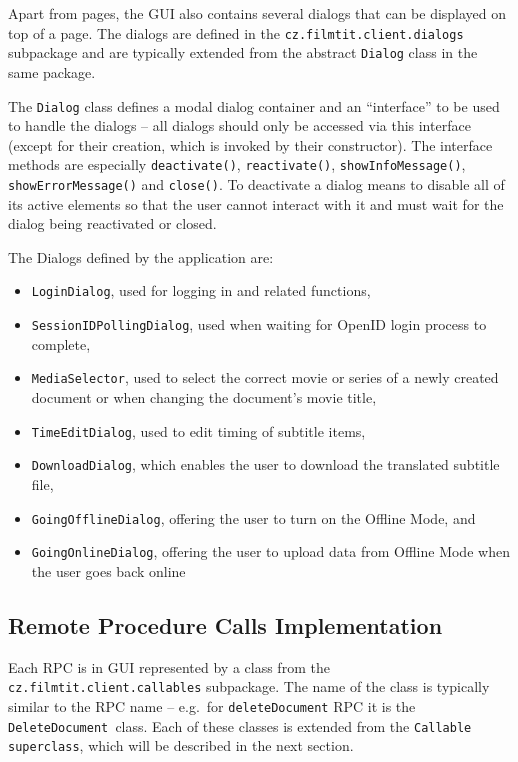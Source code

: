 Apart from pages, the GUI also contains several dialogs that can be displayed on top of a page. The dialogs are defined in the {\tt cz.filmtit.client.dialogs} subpackage and are typically extended from the abstract {\tt Dialog} class in the same package.

The {\tt Dialog} class defines a modal dialog container and an ``interface'' to be used to handle the dialogs -- all dialogs should only be accessed via this interface (except for their creation, which is invoked by their constructor).
The interface methods are especially
{\tt deactivate()}, {\tt reactivate()}, {\tt showInfoMessage()}, {\tt showErrorMessage()} and {\tt close()}. To deactivate a dialog means to disable all of its active elements so that the user cannot interact with it and must wait for the dialog being reactivated or closed.

The Dialogs defined by the application are:
\begin{itemize}
\item {\tt LoginDialog}, used for logging in and related functions,
\item {\tt SessionIDPollingDialog}, used when waiting for OpenID login process to complete,
\item {\tt MediaSelector}, used to select the correct movie or series of a newly created document or when changing the document's movie title,
\item {\tt TimeEditDialog}, used to edit timing of subtitle items,
\item {\tt DownloadDialog}, which enables the user to download the translated subtitle file,
\item {\tt GoingOfflineDialog}, offering the user to turn on the Offline Mode, and
\item {\tt GoingOnlineDialog}, offering the user to upload data from Offline Mode when the user goes back online
\end{itemize}

\subsection{Remote Procedure Calls Implementation}

Each RPC is in GUI represented by a class from the {\tt cz.filmtit.client.callables} subpackage. The name of the class is typically similar to the RPC name -- e.g.\ for {\tt deleteDocument} RPC it is the {\tt DeleteDocument }class. Each of these classes is extended from the {\tt Callable superclass}, which will be described in the next section.

